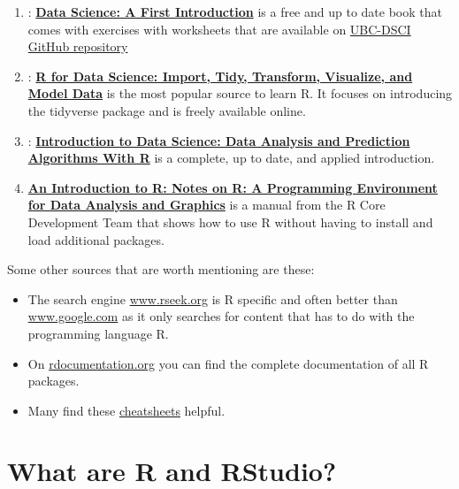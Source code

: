 \documentclass[
  12pt,
  oneside]{book}
\providecommand{\tightlist}{%
  \setlength{\itemsep}{0pt}\setlength{\parskip}{0pt}}
\theoremstyle{definition}
\theoremstyle{definition}
\theoremstyle{definition}
\theoremstyle{definition}
\theoremstyle{remark}
\begin{document}
\begin{enumerate}
\def\labelenumi{\arabic{enumi}.}
\tightlist
\item
  \citet{Timbers2022Data}: \href{https://datasciencebook.ca/}{\textbf{Data Science: A First Introduction}} is a free and up to date book that comes with exercises with worksheets that are available on \href{https://github.com/UBC-DSCI/data-science-a-first-intro-worksheets}{UBC-DSCI GitHub repository}
\item
  \citet{Wickham2023R}: \href{https://r4ds.hadley.nz/}{\textbf{R for Data Science: Import, Tidy, Transform, Visualize, and Model Data}} is the most popular source to learn R. It focuses on introducing the tidyverse package and is freely available online.
\item
  \citet{Irizarry2022Introduction}: \href{http://rafalab.dfci.harvard.edu/dsbook/}{\textbf{Introduction to Data Science: Data Analysis and Prediction Algorithms With R}} is a complete, up to date, and applied introduction.
\item
  \citet{Venables2022Introduction} \href{https://cran.r-project.org/doc/manuals/r-release/R-intro.pdf}{\textbf{An Introduction to R: Notes on R: A Programming Environment for Data Analysis and Graphics}} is a manual from the R Core Development Team that shows how to use R without having to install and load additional packages.
\end{enumerate}

Some other sources that are worth mentioning are these:

\begin{itemize}
\tightlist
\item
  The search engine \href{http://www.rseek.org}{www.rseek.org} is R specific and often better than \href{http://www.google.com}{www.google.com} as it only searches for content that has to do with the programming language R.
\item
  On \href{http://www.rdocumentation.org}{rdocumentation.org} you can find the complete documentation of all R packages.
\item
  Many find these \href{https://posit.co/resources/cheatsheets/}{cheatsheets} helpful.
\end{itemize}

\hypertarget{r-rstudio}{%
\section{What are R and RStudio?}\label{r-rstudio}}
\end{document}

